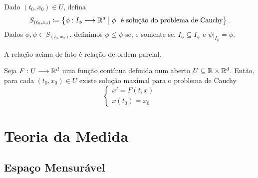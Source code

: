 \begin{defi}
	Dado $(t_0,x_0) \in U$, defina
	\begin{equation*}
	S_{(t_0,x_0)} \coloneqq \left\{\phi: I_\phi \longrightarrow \mathbb{R}^d \;\middle\vert\; \phi \text{\ \ é solução do problema de Cauchy} \right\}.
	\end{equation*}
Dados $\phi ,\psi \in S_{(t_0,x_0)}$, definimos $\phi \leq \psi $ se, e somente se, $I_{\phi } \subseteq I_{\psi}$ e $\psi|_{I_\phi} = \phi $.
\end{defi}

\begin{prop}
	A relação acima de fato é relação de ordem parcial.
\end{prop}

\begin{teo}
	Seja $F: U \longrightarrow \mathbb{R}^d$ uma função contínua definida num aberto $U \subseteq \mathbb{R} \times \mathbb{R}^d$. Então, para cada $(t_0,x_0) \in U$ existe solução maximal para o problema de Cauchy
	\begin{equation*}
	\begin{cases}
		x' = F(t,x) \\
		x(t_0)=x_0
	\end{cases}
	\end{equation*}
\end{teo}









































\chapter{Teoria da Medida}

\section{Espaço Mensurável}


